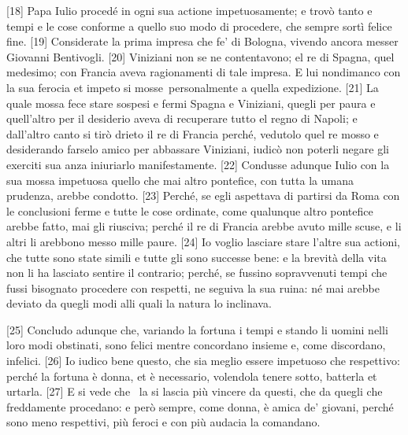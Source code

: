 {[}18{]} Papa Iulio  procedé in ogni sua actione impetuosamente; e trovò tanto e tempi e le cose conforme a quello suo modo di procedere, che sempre sortì felice fine. {[}19{]} Considerate la prima impresa che fe' di Bologna, vivendo ancora messer Giovanni Bentivogli. {[}20{]} Viniziani non se ne contentavono; el re di Spagna, quel medesimo; con Francia aveva ragionamenti di tale impresa. E lui nondimanco con la sua ferocia et impeto si mosse\est\ personalmente a quella expedizione. {[}21{]} La quale mossa fece stare sospesi e fermi Spagna e Viniziani, quegli per paura e quell'altro per il desiderio aveva di recuperare tutto el regno di Napoli; e dall'altro canto si tirò drieto il re di Francia perché, vedutolo quel re mosso e  desiderando farselo amico per abbassare Viniziani, iudicò non poterli negare gli exerciti sua anza iniuriarlo manifestamente. {[}22{]} Condusse adunque Iulio con la sua mossa impetuosa quello che mai altro pontefice, con tutta la umana prudenza, arebbe condotto. {[}23{]} Perché, se egli aspettava di partirsi da Roma con le conclusioni ferme e tutte le cose ordinate, come qualunque altro pontefice arebbe fatto, mai gli riusciva; perché il re di Francia arebbe avuto mille scuse, e li altri li arebbono messo mille paure. {[}24{]} Io voglio lasciare stare l'altre sua actioni, che tutte sono state simili e tutte gli sono successe bene: e la brevità della vita non li ha lasciato sentire il contrario; perché, se fussino sopravvenuti tempi che fussi bisognato procedere con respetti, ne seguiva la sua ruina: né mai arebbe deviato da quegli modi alli quali la natura lo inclinava.

{[}25{]} Concludo adunque che, variando la fortuna i tempi e stando li
uomini nelli loro modi obstinati, sono felici mentre concordano insieme
e, come discordano, infelici. {[}26{]} Io iudico bene questo, che sia
meglio essere impetuoso che respettivo: perché la fortuna è donna, et è
necessario, volendola tenere sotto, batterla et urtarla.
{[}27{]} E si vede che \est\ la si lascia più vincere da questi, che da quegli che
freddamente procedano: e però sempre, come donna, è amica de' giovani,
perché sono meno respettivi, più feroci e con più audacia la comandano.


